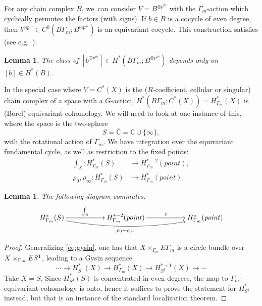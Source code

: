 \documentclass[10pt,a4paper]{amsart}
\providecommand{\eg}{e.g.\ }
\theoremstyle{plain}
\newtheorem{lemma}[theorem]{Lemma}
\theoremstyle{definition}
\newcommand{\bC}{{\mathbb C}}
\begin{document}
For any chain complex $B$, we~can consider $V = B^{\otimes p^m}$ with the $\Gamma_m$-action which cyclically permutes the factors (with signs). If $b \in B$ is a cocycle of even degree, then $b^{\otimes p^m} \in C^0(B\Gamma_m;B^{\otimes p^m})$ is an equivariant cocycle. This construction satisfies (see \eg \cite[Lem.\,2.5]{seidel-wilkins21}):

\begin{lemma} \label{th:diagonal}
The class of $[b^{\otimes p^m}] \in H^*(B\Gamma_m;B^{\otimes p^m})$ depends only on $[b] \in H^*(B)$.
\end{lemma}

In the special case where $V = C^*(X)$ is the ($R$-coefficient, cellular or singular) chain complex of a space with a $G$-action, $H^*(B\Gamma_m;C^*(X)) = H^*_{\Gamma_m}(X)$ is (Borel) equivariant cohomology. We will need to look at one instance of this, where the space is the two-sphere
\begin{equation*}
S = \bar{\bC} = \bC \cup \{\infty\},
\end{equation*}
with the rotational action of $\Gamma_m$. We have integration over the equivariant fundamental cycle, as well as restriction to the fixed points:
\begin{equation*}
\begin{aligned}
{\textstyle \int_S}: H^*_{\Gamma_m}(S) &\to
H^{*-2}_{\Gamma_m}(\mathit{point}), \\
\rho_0,\rho_\infty : H^*_{\Gamma_m}(S) &\to H^*_{\Gamma_m}(\mathit{point}).
\end{aligned}
\end{equation*}

\begin{lemma} \label{th:localisation}
The following diagram commutes:
\begin{equation*}
\xymatrix{
\ar@/_1pc/[rrrr]_-{\rho_0 - \rho_\infty}
H^*_{\Gamma_m}(S) \ar[rr]^-{\int_S} &&
H^{*-2}_{\Gamma_m}(\mathit{point}) \ar[rr]^-{t} && H^*_{\Gamma_m}(\mathit{point})
}
\end{equation*}
\end{lemma}

\begin{proof}
Generalizing \eqref{eq:gysin}, one has that $X \times_{\Gamma_m} E\Gamma_m$ is a circle bundle over $X \times_{\Gamma_m}\nobreak ES^1$, leading to a Gysin sequence
\begin{equation*}
\cdots \to
H^*_{S^1}(X) \to H^*_{\Gamma_m}(X) \to H^{*-1}_{S^1}(X) \to \cdots
\end{equation*}
Take $X = S$. Since $H^*_{S^1}(S)$ is concentrated in even degrees, the map to $\Gamma_m$-equivariant cohomology is onto, hence it suffices to prove the statement for $H^*_{S^1}$ instead, but that is an instance of the standard localization theorem.
\end{proof}
\end{document}
